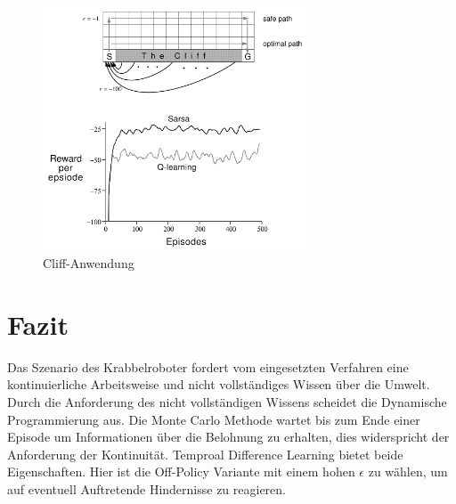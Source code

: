 \documentclass[10pt]{scrartcl}
\begin{document}
\begin{figure}[htc]
    \centering
    \includegraphics[width=0.7\textwidth]{Grafiken/cliff.png}
    \caption{Cliff-Anwendung \cite{rli}}
    \label{fig:cliff}
\end{figure}

\section{Fazit}
Das Szenario des Krabbelroboter fordert vom eingesetzten Verfahren eine kontinuierliche Arbeitsweise und nicht vollständiges Wissen über die Umwelt. Durch die Anforderung des nicht vollständigen Wissens scheidet die Dynamische Programmierung aus. Die Monte Carlo Methode wartet bis zum Ende einer Episode um Informationen über die Belohnung zu erhalten, dies widerspricht der Anforderung der Kontinuität. Temproal Difference Learning bietet beide Eigenschaften. Hier ist die Off-Policy Variante mit einem hohen $\epsilon$ zu wählen, um auf eventuell Auftretende Hindernisse zu reagieren.



\end{document}
